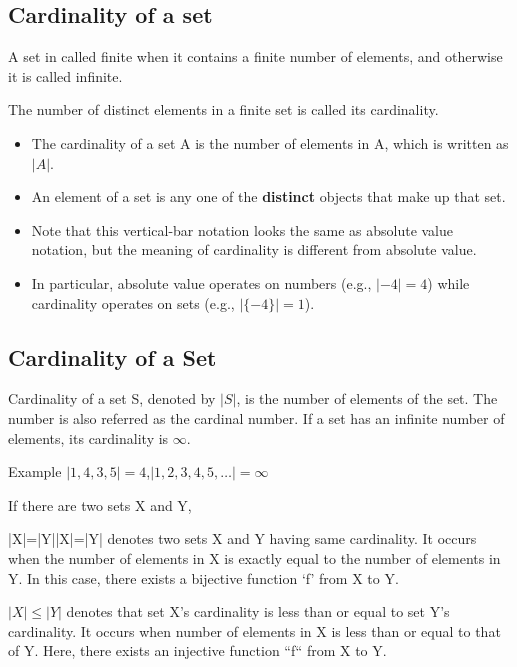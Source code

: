 \documentclass[]{article}
\begin{document}
\subsection{Cardinality of a set}
A set in called finite when it contains a finite number of elements, and 
otherwise it is called infinite.

The number of distinct elements in a finite set is called its cardinality.


\begin{itemize}
\item The cardinality of a set A is the number of elements in A, which is written as $|A|$.
\item An element of a set is any one of the \textbf{distinct} objects that make up that set.

\end{itemize}


\begin{itemize}

\item Note that this vertical-bar notation looks the same as absolute value notation, 
but the meaning of cardinality is different from absolute value.

\item In particular, absolute value operates on numbers (e.g., $|-4| = 4$) 
while cardinality operates on sets (e.g., $|\{-4\}| = 1$).
\end{itemize}



\subsection{Cardinality of a Set}
Cardinality of a set S, denoted by $|S|$, is the number of elements of the set. The number is also referred as the cardinal number. If a set has an infinite number of elements, its cardinality is $\infty$.

Example  $|{1,4,3,5}|=4$,$|{1,2,3,4,5,\ldots}|=\infty$

If there are two sets X and Y,

|X|=|Y||X|=|Y| denotes two sets X and Y having same cardinality. It occurs when the number of elements in X is exactly equal to the number of elements in Y. In this case, there exists a bijective function ‘f’ from X to Y.

$|X|\leq|Y|$ denotes that set X's cardinality is less than or equal to set Y’s cardinality. It occurs when number of elements in X is less than or equal to that of Y. Here, there exists an injective function ``f`` from X to Y.
\end{document}
